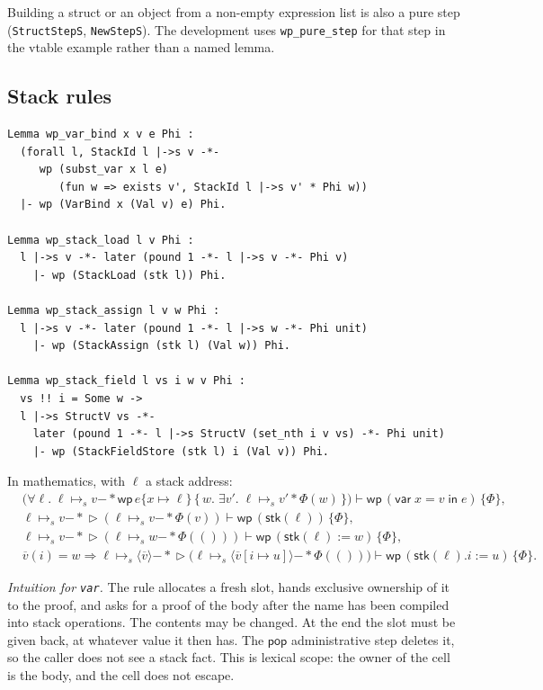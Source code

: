 \documentclass[11pt]{article}
\newcommand{\Unit}{\mathsf{()}}
\newcommand{\ptss}{\mathrel{\mapsto_{s}}}
\newcommand{\sep}{\mathbin{*}}
\newcommand{\wand}{\mathbin{-\!\!*}}
\newcommand{\later}{\mathop{\triangleright}}
\newcommand{\Wpre}{\mathsf{wp}}
\begin{document}
Building a struct or an object from a non-empty expression list is also a pure step (\texttt{StructStepS}, \texttt{NewStepS}).
The development uses \texttt{wp\_pure\_step} for that step in the vtable example rather than a named lemma.

\subsection{Stack rules}

\begin{lstlisting}
Lemma wp_var_bind x v e Phi :
  (forall l, StackId l |->s v -*-
     wp (subst_var x l e)
        (fun w => exists v', StackId l |->s v' * Phi w))
  |- wp (VarBind x (Val v) e) Phi.

Lemma wp_stack_load l v Phi :
  l |->s v -*- later (pound 1 -*- l |->s v -*- Phi v)
    |- wp (StackLoad (stk l)) Phi.

Lemma wp_stack_assign l v w Phi :
  l |->s v -*- later (pound 1 -*- l |->s w -*- Phi unit)
    |- wp (StackAssign (stk l) (Val w)) Phi.

Lemma wp_stack_field l vs i w v Phi :
  vs !! i = Some w ->
  l |->s StructV vs -*-
    later (pound 1 -*- l |->s StructV (set_nth i v vs) -*- Phi unit)
    |- wp (StackFieldStore (stk l) i (Val v)) Phi.
\end{lstlisting}

In mathematics, with \(\ell\) a stack address:
\begin{align*}
&\bigl(\forall \ell.\;
   \ell \ptss v \wand
   \Wpre\,e\{x\mapsto\ell\}\,\{\,w.\;\exists v'.\; \ell \ptss v' \sep \Phi(w)\,\}\bigr)
  \vdash
  \Wpre\,(\mathsf{var}\;x=v\;\mathsf{in}\;e)\,\{\Phi\},\\
&\ell \ptss v \wand \later(\ell \ptss v \wand \Phi(v))
  \vdash \Wpre\,(\mathsf{stk}(\ell))\,\{\Phi\},\\
&\ell \ptss v \wand \later(\ell \ptss w \wand \Phi(\Unit))
  \vdash \Wpre\,(\mathsf{stk}(\ell):=w)\,\{\Phi\},\\
&\overline{v}(i)=w \Rightarrow
  \ell \ptss \langle\overline{v}\rangle
  \wand \later\bigl(\ell \ptss \langle\overline{v}[i\mapsto u]\rangle \wand \Phi(\Unit)\bigr)
  \vdash
  \Wpre\,(\mathsf{stk}(\ell).i := u)\,\{\Phi\}.
\end{align*}

\textit{Intuition for \texttt{var}.}
The rule allocates a fresh slot, hands exclusive ownership of it to the proof, and asks for a proof of the body after the name has been compiled into stack operations.
The contents may be changed.
At the end the slot must be given back, at whatever value it then has.
The \(\mathsf{pop}\) administrative step deletes it, so the caller does not see a stack fact.
This is lexical scope: the owner of the cell is the body, and the cell does not escape.
\end{document}
